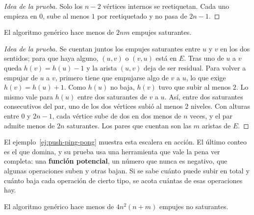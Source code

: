 \documentclass[11pt,letterpaper]{article}
\begin{document}
\begin{proof}[Idea de la prueba]
  Solo los $n - 2$ vértices internos se reetiquetan. Cada uno empieza
  en $0$, sube al menos $1$ por reetiquetado y no pasa de $2n - 1$.
\end{proof}

\begin{lema}
  \label{lem:push-saturantes}
  El algoritmo genérico hace menos de $2nm$ empujes saturantes.
\end{lema}

\begin{proof}[Idea de la prueba]
  Se cuentan juntos los empujes saturantes entre $u$ y $v$ en los dos
  sentidos; para que haya alguno, $(u, v)$ o $(v, u)$ está en $E$. Tras
  uno de $u$ a $v$ queda $h(v) = h(u) - 1$ y la arista $(u, v)$ deja de
  ser residual. Para volver a empujar de $u$ a $v$, primero tiene que
  empujarse algo de $v$ a $u$, lo que exige $h(v) = h(u) + 1$. Como
  $h(u)$ no baja, $h(v)$ tuvo que subir al menos $2$. Lo mismo vale
  para $h(u)$ entre dos saturantes de $v$ a $u$. Así, entre dos
  saturantes consecutivos del par, uno de los dos vértices subió al
  menos $2$ niveles. Con alturas entre $0$ y $2n - 1$, cada vértice
  sube de dos en dos menos de $n$ veces, y el par admite menos de $2n$
  saturantes. Los pares que cuentan son las $m$ aristas de $E$.
\end{proof}

El ejemplo~\ref{ej:push-ping-pong} muestra esta escalera en acción.
El último conteo es el que domina, y su prueba usa una herramienta que
vale la pena ver completa: una \textbf{función potencial}, un número
que nunca es negativo, que algunas operaciones suben y otras bajan.
Si se sabe cuánto puede subir en total y cuánto baja cada operación de
cierto tipo, se acota cuántas de esas operaciones hay.

\begin{lema}
  \label{lem:push-no-saturantes}
  El algoritmo genérico hace menos de $4n^2(n + m)$ empujes no
  saturantes.
\end{lema}
\end{document}
